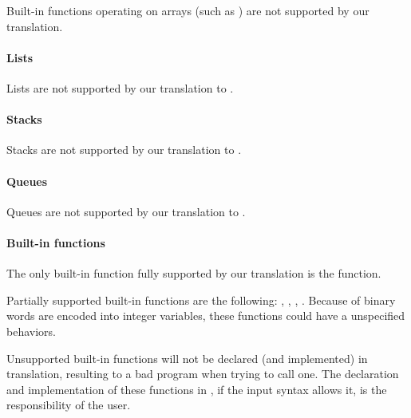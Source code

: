 \begin{becareful}
	Built-in functions operating on arrays (such as ) are not supported by our translation.
\end{becareful}

\paragraph{Lists}

Lists are not supported by our translation to \uppaal{}.

\paragraph{Stacks}

Stacks are not supported by our translation to \uppaal{}.

\paragraph{Queues}

Queues are not supported by our translation to \uppaal{}.


\paragraph{Built-in functions}

The only \imitator{} built-in function fully supported by our translation is the  function.

Partially supported \imitator{} built-in functions are the following: , , , .
Because of binary words are encoded into integer variables, these functions could have a unspecified behaviors.

\begin{becareful}
	Unsupported \imitator{} built-in functions will not be declared (and implemented) in \uppaal{} translation, resulting to a bad program when trying to call one. The declaration and implementation of these functions in \uppaal{}, if the \uppaal{} input syntax allows it, is the responsibility of the user.
\end{becareful}

